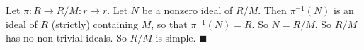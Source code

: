 Let $\pi : R \to R/M : r \mapsto \overline{r}$. Let $N$ be a nonzero ideal of $R/M$. Then $\pi^{-1}(N)$ is an ideal of $R$ (strictly) containing $M$, so that $\pi^{-1}(N)=R$. So $N= R/M$. So $R/M$ has no non-trivial ideals. So $R/M$ is simple.
 $\blacksquare$